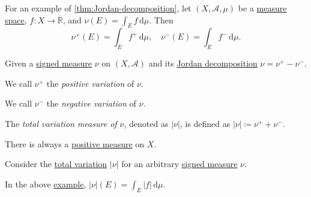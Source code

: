 \begin{eg}\label{eg:lec30}
	For an example of \autoref{thm:Jordan-decomposition}, let \((X, \mathcal{A}, \mu)\) be a \hyperref[def:measure-space]{measure space},
	\(f \colon X \to \overline{\mathbb{R}}\), and \(\nu(E) = \int_E f \,\mathrm{d} \mu\). Then
	\[
		\nu^+(E) = \int_E f^+ \,\mathrm{d} \mu,\quad \nu^-(E) = \int_E f^- \,\mathrm{d} \mu.
	\]
\end{eg}

\begin{definition*}
	Given a \hyperref[def:signed-measure]{signed measure} \(\nu \) on \((X, \mathcal{A} )\) and its
	\hyperref[thm:Jordan-decomposition]{Jordan decomposition} \(\nu = \nu ^+ - \nu ^-\).
	\begin{definition}\label{def:positive-variation-measure}
		We call \(\nu ^+\) the \emph{positive variation} of \(\nu \).
	\end{definition}
	\begin{definition}\label{def:negative-variation-measure}
		We call \(\nu ^-\) the \emph{negative variation} of \(\nu \).
	\end{definition}
	\begin{definition}\label{def:total-variation}
		The \emph{total variation measure of \(\nu\)}, denoted as \(\left\vert \nu \right\vert \), is defined as \(\left\vert \nu \right\vert \coloneqq \nu^+ + \nu^-\).
	\end{definition}
\end{definition*}

\begin{remark}
	There is always a \hyperref[def:signed-measure]{positive measure} on \(X\).
\end{remark}
\begin{explanation}
	Consider the \hyperref[def:total-variation]{total variation} \(\left\vert \nu \right\vert \) for an arbitrary \hyperref[def:signed-measure]{signed measure} \(\nu \).
\end{explanation}

\begin{eg}
	In the above \hyperref[eg:lec30]{example}, \(\left\vert \nu \right\vert (E) = \int_E \left\vert f \right\vert \,\mathrm{d} \mu\).
\end{eg}

